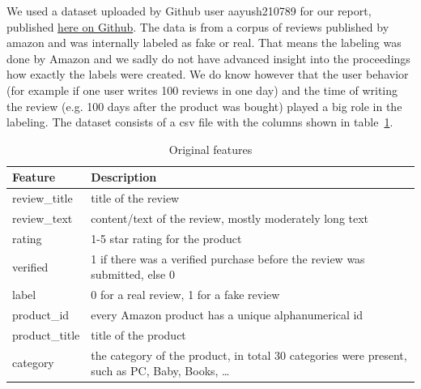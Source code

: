 \documentclass{article}
\begin{document}
We used a dataset uploaded by Github user aayush210789 for our report, published \href{https://github.com/aayush210789/Deception-Detection-on-Amazon-reviews-dataset}{here on Github}. The data is from a corpus of reviews published by amazon and was internally labeled as fake or real. That means the labeling was done by Amazon and we sadly do not have advanced insight into the proceedings how exactly the labels were created. We do know however that the user behavior (for example if one user writes 100 reviews in one day) and the time of writing the review (e.g. 100 days after the product was bought) played a big role in the labeling.
The dataset consists of a csv file with the columns shown in table~\ref{tab:feat1}.
\begin{table}[ht]
  \centering
  \caption{Original features}
  \label{tab:feat1}
  \begin{tabular}{l p{6cm}}
    Feature        & Description                                                                                      \\
    \hline
    review\_title  & title of the review                                                                              \\

    review\_text   & content/text of the review, mostly moderately long text                                          \\

    rating         & 1-5 star rating for the product                                                                  \\

    verified       & 1 if there was a verified purchase before the review was submitted, else 0                       \\

    label          & 0 for a real review, 1 for a fake review                                                         \\
    product\_id    & every Amazon product has a unique alphanumerical id                                              \\
    product\_title & title of the product                                                                             \\
    category       & the category of the product, in total 30 categories were present, such as PC, Baby, Books, \dots \\
  \end{tabular}
\end{table}
\end{document}
